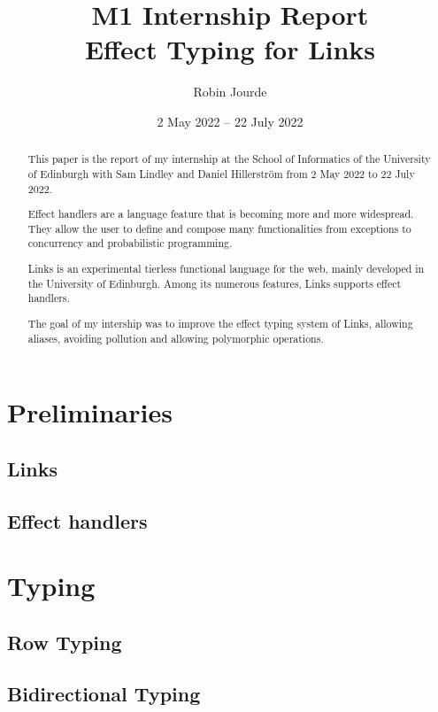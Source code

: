 \documentclass{amsart}
\author[R. Jourde]{Robin Jourde}
\title[M1 Intership Report]{M1 Internship Report\\ Effect Typing for Links}
\date{2 May 2022 -- 22 July 2022}
\begin{document}
\maketitle


\begin{abstract}
  This paper is the report of my internship at the School of Informatics of the University of Edinburgh with Sam Lindley and Daniel Hillerström from 2 May 2022 to 22 July 2022.

  Effect handlers are a language feature that is becoming more and more widespread. They allow the user to define and compose many functionalities from exceptions to concurrency and probabilistic programming.

  Links is an experimental tierless functional language for the web, mainly developed in the University of Edinburgh. Among its numerous features, Links supports effect handlers.

  The goal of my intership was to improve the effect typing system of Links, allowing aliases, avoiding pollution and allowing polymorphic operations.
\end{abstract}


\tableofcontents


\section{Preliminaries}


\subsection{Links}


\subsection{Effect handlers}



\section{Typing}

\subsection{Row Typing}


\subsection{Bidirectional Typing}
\end{document}
